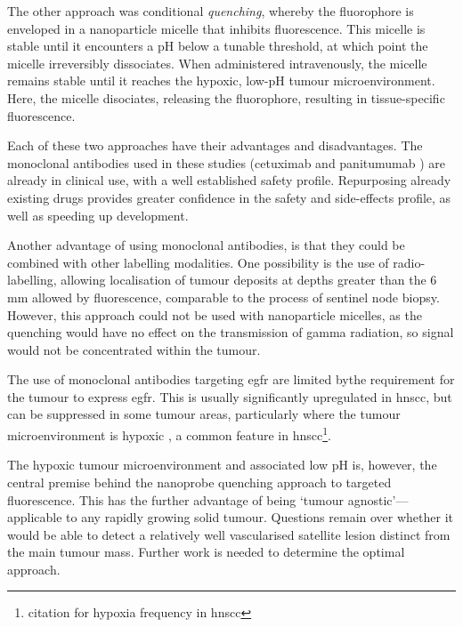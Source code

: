 The other approach was conditional \textit{quenching}, whereby the fluorophore is enveloped in a nanoparticle micelle that inhibits fluorescence\cite{voskuilExploitingMetabolicAcidosis2020}.
This micelle is stable until it encounters a pH below a tunable threshold, at which point the micelle irreversibly dissociates. 
When administered intravenously, the micelle remains stable until it reaches the hypoxic, low-pH tumour microenvironment. 
Here, the micelle disociates, releasing the fluorophore, resulting in tissue-specific fluorescence.

Each of these two approaches have their advantages and disadvantages.
The monoclonal antibodies used in these studies (cetuximab \cite{warramFluorescenceImagingLocalize2016, voskuilf.j.FluorescenceguidedImagingResection2020}and panitumumab \cite{gaor.w.DeterminationTumorMargins2018, vankeulenRapidNoninvasiveFluorescence2019}) are already in clinical use, with a well established safety profile.
Repurposing already existing drugs provides greater confidence in the safety and side-effects profile, as well as speeding up development. 

Another advantage of using monoclonal antibodies, is that they could be combined with other labelling modalities.
One possibility is the use of radio-labelling, allowing localisation of tumour deposits at depths greater than the 6 mm allowed by fluorescence, comparable to the process of sentinel node biopsy.
However, this approach could not be used with nanoparticle micelles, as the quenching would have no effect on the transmission of gamma radiation, so signal would not be concentrated within the tumour.

The use of monoclonal antibodies targeting \gls{egfr} are limited bythe requirement for the tumour to express \gls{egfr}.
This is usually significantly upregulated in \gls{hnscc}, but can be suppressed in some tumour areas, particularly where the tumour microenvironment is hypoxic \cite{mayerDownregulationEGFRHypoxic2016}, a common feature in \gls{hnscc}\footnote{citation for hypoxia frequency in hnscc}.

The hypoxic tumour microenvironment and associated low pH is, however, the central premise behind the nanoprobe quenching approach to targeted fluorescence.
This has the further advantage of being `tumour agnostic'---applicable to any rapidly growing solid tumour.
Questions remain over whether it would be able to detect a relatively well vascularised satellite lesion distinct from the main tumour mass. 
Further work is needed to determine the optimal approach.

